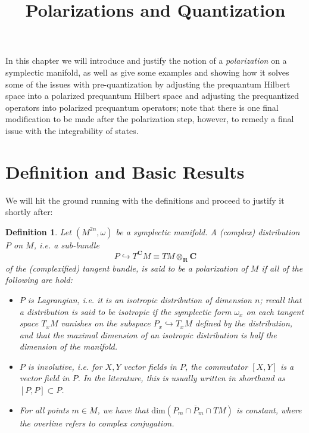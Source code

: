\documentclass{tufte-handout}
\title{Polarizations and Quantization}
\newtheorem{defn}{Definition}
\begin{document}
In this chapter we will introduce and justify the notion of a \emph{polarization} on a symplectic manifold, as well as give some examples and showing how it solves some of the issues with pre-quantization by adjusting the prequantum Hilbert space into a polarized prequantum Hilbert space and adjusting the prequantized operators into polarized prequantum operators; note that there is one final modification to be made after the polarization step, however, to remedy a final issue with the integrability of states.

\section{Definition and Basic Results}

We will hit the ground running with the definitions and proceed to justify it shortly after:

\begin{defn}
Let $(M^{2n},\omega)$ be a symplectic manifold. A (complex) distribution $P$ on $M$, i.e. a sub-bundle
$$
P \hookrightarrow T^{\mathbf{C}}M \equiv TM \otimes_{\mathbf{R}} \mathbf{C}
$$
of the (complexified) tangent bundle, is said to be a \emph{polarization} of $M$ if all of the following are hold:
\begin{itemize}
\item $P$ is \emph{Lagrangian}, i.e. it is an \emph{isotropic} distribution of dimension $n$; recall that a distribution is said to be isotropic if the symplectic form $\omega_x$ on each tangent space $T_xM$ vanishes on the subspace $P_x \hookrightarrow T_xM$ defined by the distribution, and that the maximal dimension of an isotropic distribution is half the dimension of the manifold.

\item $P$ is \emph{involutive}, i.e. for $X,Y$ vector fields in $P$, the commutator $[X,Y]$ is a vector field in $P$. In the literature, this is usually written in shorthand as $[P,P] \subset P$.

\item For all points $m \in M$, we have that $\mathrm{dim}(P_m \cap \overline{P}_m \cap TM)$ is constant, where the overline refers to complex conjugation.

\end{itemize}
\end{defn}
\end{document}
